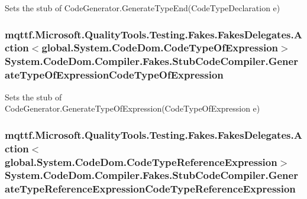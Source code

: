 Sets the stub of Code\-Generator.\-Generate\-Type\-End(\-Code\-Type\-Declaration e)

\hypertarget{class_system_1_1_code_dom_1_1_compiler_1_1_fakes_1_1_stub_code_compiler_a780e43a2067edcd2c77afcbff302d06f}{
\subsubsection[{Generate\-Type\-Of\-Expression\-Code\-Type\-Of\-Expression}]{\setlength{\rightskip}{0pt plus 5cm}mqttf.\-Microsoft.\-Quality\-Tools.\-Testing.\-Fakes.\-Fakes\-Delegates.\-Action$<$global.\-System.\-Code\-Dom.\-Code\-Type\-Of\-Expression$>$ System.\-Code\-Dom.\-Compiler.\-Fakes.\-Stub\-Code\-Compiler.\-Generate\-Type\-Of\-Expression\-Code\-Type\-Of\-Expression}}\label{class_system_1_1_code_dom_1_1_compiler_1_1_fakes_1_1_stub_code_compiler_a780e43a2067edcd2c77afcbff302d06f}


Sets the stub of Code\-Generator.\-Generate\-Type\-Of\-Expression(\-Code\-Type\-Of\-Expression e)

\hypertarget{class_system_1_1_code_dom_1_1_compiler_1_1_fakes_1_1_stub_code_compiler_a4c92f962e1ed07ba07974732276b28d3}{
\subsubsection[{Generate\-Type\-Reference\-Expression\-Code\-Type\-Reference\-Expression}]{\setlength{\rightskip}{0pt plus 5cm}mqttf.\-Microsoft.\-Quality\-Tools.\-Testing.\-Fakes.\-Fakes\-Delegates.\-Action$<$global.\-System.\-Code\-Dom.\-Code\-Type\-Reference\-Expression$>$ System.\-Code\-Dom.\-Compiler.\-Fakes.\-Stub\-Code\-Compiler.\-Generate\-Type\-Reference\-Expression\-Code\-Type\-Reference\-Expression}}\label{class_system_1_1_code_dom_1_1_compiler_1_1_fakes_1_1_stub_code_compiler_a4c92f962e1ed07ba07974732276b28d3}


